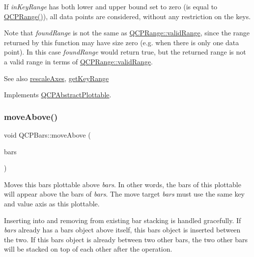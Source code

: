 If {\itshape in\+Key\+Range} has both lower and upper bound set to zero (is equal to {\ttfamily \mbox{\hyperlink{class_q_c_p_range}{Q\+C\+P\+Range()}}}), all data points are considered, without any restriction on the keys.

Note that {\itshape found\+Range} is not the same as \mbox{\hyperlink{class_q_c_p_range_ab38bd4841c77c7bb86c9eea0f142dcc0}{Q\+C\+P\+Range\+::valid\+Range}}, since the range returned by this function may have size zero (e.\+g. when there is only one data point). In this case {\itshape found\+Range} would return true, but the returned range is not a valid range in terms of \mbox{\hyperlink{class_q_c_p_range_ab38bd4841c77c7bb86c9eea0f142dcc0}{Q\+C\+P\+Range\+::valid\+Range}}.

\begin{DoxySeeAlso}{See also}
\mbox{\hyperlink{class_q_c_p_abstract_plottable_a1491c4a606bccd2d09e65e11b79eb882}{rescale\+Axes}}, \mbox{\hyperlink{class_q_c_p_bars_ac5a3854774d9d9cd129b1eae1426de2d}{get\+Key\+Range}} 
\end{DoxySeeAlso}


Implements \mbox{\hyperlink{class_q_c_p_abstract_plottable_a4de773988b21ed090fddd27c6a3a3dcb}{Q\+C\+P\+Abstract\+Plottable}}.

\mbox{\label{class_q_c_p_bars_ac22e00a6a41509538c21b04f0a57318c}} 
\subsubsection{\texorpdfstring{move\+Above()}{moveAbove()}}
{\footnotesize\ttfamily void Q\+C\+P\+Bars\+::move\+Above (\begin{DoxyParamCaption}\item[{\mbox{\hyperlink{class_q_c_p_bars}{Q\+C\+P\+Bars}} $\ast$}]{bars }\end{DoxyParamCaption})}

Moves this bars plottable above {\itshape bars}. In other words, the bars of this plottable will appear above the bars of {\itshape bars}. The move target {\itshape bars} must use the same key and value axis as this plottable.

Inserting into and removing from existing bar stacking is handled gracefully. If {\itshape bars} already has a bars object above itself, this bars object is inserted between the two. If this bars object is already between two other bars, the two other bars will be stacked on top of each other after the operation.


